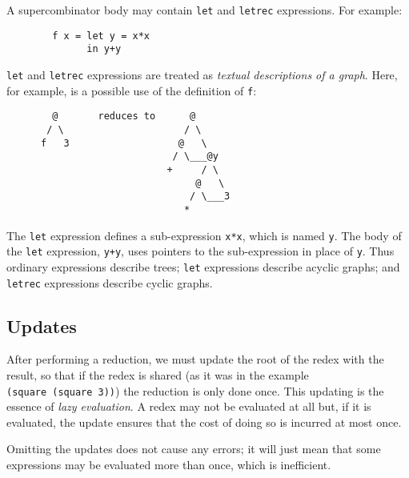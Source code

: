 A supercombinator body may contain \mbox{\tt let} and \mbox{\tt letrec} expressions.
For example:
\begin{verbatim}
        f x = let y = x*x
              in y+y
\end{verbatim}
\mbox{\tt let} and \mbox{\tt letrec} expressions are treated as {\em textual descriptions of
a graph}.  Here, for example, is a possible use of the definition of \mbox{\tt f}:
\begin{verbatim}
        @       reduces to      @
       / \                     / \
      f   3                   @   \
                             / \___@y
                            +     / \
                                 @   \
                                / \___3
                               *
\end{verbatim}
The \mbox{\tt let} expression defines a sub-expression \mbox{\tt x*x}, which is named \mbox{\tt y}.
The body of the \mbox{\tt let} expression, \mbox{\tt y+y}, uses pointers to the sub-expression
in place of \mbox{\tt y}.  Thus ordinary expressions describe trees; \mbox{\tt let}\indexTT{let} expressions
describe acyclic graphs; and \mbox{\tt letrec} expressions describe cyclic
graphs.

\subsection{Updates}
\label{sect:templ:update-review}

After performing a reduction, we must update the root of the redex with
the result, so that if the redex is shared (as it was in the example
\mbox{\tt (square\ (square\ 3))}) the reduction is only done once.
This updating is the essence of {\em lazy
evaluation}.
A redex may not be evaluated at all but, if it is evaluated, the
update ensures that the cost of doing so is incurred at most once.
\index{updates}

Omitting the updates does not cause any errors; it will just mean that
some expressions may be evaluated more than once, which is inefficient.

